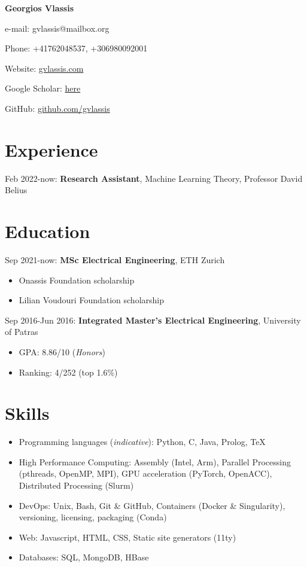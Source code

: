 \documentclass{article}
\begin{document}
\begin{Center}

	{\LARGE \bfseries \color{primary} Georgios Vlassis \par}

	{\large \color{secondary} e-mail: gvlassis@mailbox.org \par}

	{\large \color{secondary} Phone: +41762048537, +306980092001 \par}

	{\large \color{secondary} Website: \href{https://gvlassis.com/}{gvlassis.com} \par}

	{\large \color{secondary} Google Scholar: \href{https://scholar.google.com/citations?user=wIPwiSoAAAAJ&hl=en}{here} \par}

	{\large \color{secondary} GitHub: \href{https://github.com/gvlassis}{github.com/gvlassis} \par}


\end{Center}

\section*{Experience}
Feb 2022-now: \textbf{Research Assistant}, Machine Learning Theory, Professor David Belius

\section*{Education}
Sep 2021-now: \textbf{MSc Electrical Engineering}, ETH Zurich
\begin{itemize}
	\item Onassis Foundation scholarship
	\item Lilian Voudouri Foundation scholarship
\end{itemize}

Sep 2016-Jun 2016: \textbf{Integrated Master's Electrical Engineering}, University of Patras
\begin{itemize}
	\item GPA: 8.86/10 (\textit{Honors})
	\item Ranking: 4/252 (top 1.6\%)
\end{itemize}

\section*{Skills}
\begin{itemize}
	\item Programming languages (\textit{indicative}): Python, C, Java, Prolog, \TeX
	\item High Performance Computing: Assembly (Intel, Arm), Parallel Processing (pthreads, OpenMP, MPI), GPU acceleration (PyTorch, OpenACC), Distributed Processing (Slurm)
	\item DevOps: Unix, Bash, Git \& GitHub, Containers (Docker \& Singularity), versioning, licensing, packaging (Conda)
	\item Web: Javascript, HTML, CSS, Static site generators (11ty)
	\item Databases: SQL, MongoDB, HBase
\end{itemize}
\end{document}
